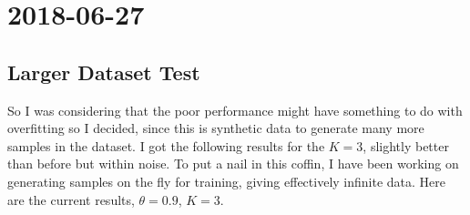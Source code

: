\documentclass[a4paper]{article}
\newcommand{\DatestampYMD}[3]{\mbox{#1-#2-#3}}
\newcommand{\entry}[3]{\newpage\section*{\DatestampYMD{#1}{#2}{#3}} }
\begin{document}
\entry{2018}{06}{27}
\subsection*{Larger Dataset Test}
So I was considering that the poor performance might have something to do with overfitting so I decided, since this is synthetic data to generate many more samples in the dataset. I got the following results for the $K=3$, slightly better than before but within noise. To put a nail in this coffin, I have been working on generating samples on the fly for training, giving effectively infinite data. Here are the current results, $\theta = 0.9$, $K = 3$.
\begin{figure}[H]
    \begin{minipage}{.45\linewidth}
        \centering
    \end{minipage}
    \begin{minipage}{.45\linewidth}
        \centering
\end{minipage}
\end{figure}
\end{document}
